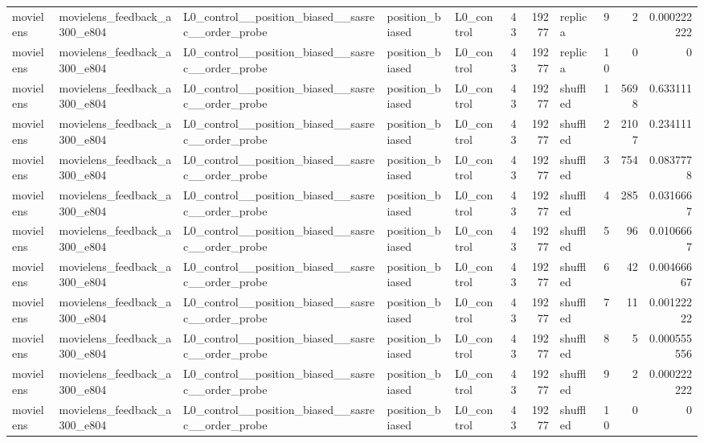 \begin{table}[htbp!]
\begin{tabular}{lllllrrlrrr}
movielens & movielens\_feedback\_a300\_e804 & L0\_control\_\_position\_biased\_\_sasrec\_\_order\_probe & position\_biased & L0\_control & 43 & 19277 & replica & 9 & 2 & 0.000222222 \\
movielens & movielens\_feedback\_a300\_e804 & L0\_control\_\_position\_biased\_\_sasrec\_\_order\_probe & position\_biased & L0\_control & 43 & 19277 & replica & 10 & 0 & 0 \\
movielens & movielens\_feedback\_a300\_e804 & L0\_control\_\_position\_biased\_\_sasrec\_\_order\_probe & position\_biased & L0\_control & 43 & 19277 & shuffled & 1 & 5698 & 0.633111 \\
movielens & movielens\_feedback\_a300\_e804 & L0\_control\_\_position\_biased\_\_sasrec\_\_order\_probe & position\_biased & L0\_control & 43 & 19277 & shuffled & 2 & 2107 & 0.234111 \\
movielens & movielens\_feedback\_a300\_e804 & L0\_control\_\_position\_biased\_\_sasrec\_\_order\_probe & position\_biased & L0\_control & 43 & 19277 & shuffled & 3 & 754 & 0.0837778 \\
movielens & movielens\_feedback\_a300\_e804 & L0\_control\_\_position\_biased\_\_sasrec\_\_order\_probe & position\_biased & L0\_control & 43 & 19277 & shuffled & 4 & 285 & 0.0316667 \\
movielens & movielens\_feedback\_a300\_e804 & L0\_control\_\_position\_biased\_\_sasrec\_\_order\_probe & position\_biased & L0\_control & 43 & 19277 & shuffled & 5 & 96 & 0.0106667 \\
movielens & movielens\_feedback\_a300\_e804 & L0\_control\_\_position\_biased\_\_sasrec\_\_order\_probe & position\_biased & L0\_control & 43 & 19277 & shuffled & 6 & 42 & 0.00466667 \\
movielens & movielens\_feedback\_a300\_e804 & L0\_control\_\_position\_biased\_\_sasrec\_\_order\_probe & position\_biased & L0\_control & 43 & 19277 & shuffled & 7 & 11 & 0.00122222 \\
movielens & movielens\_feedback\_a300\_e804 & L0\_control\_\_position\_biased\_\_sasrec\_\_order\_probe & position\_biased & L0\_control & 43 & 19277 & shuffled & 8 & 5 & 0.000555556 \\
movielens & movielens\_feedback\_a300\_e804 & L0\_control\_\_position\_biased\_\_sasrec\_\_order\_probe & position\_biased & L0\_control & 43 & 19277 & shuffled & 9 & 2 & 0.000222222 \\
movielens & movielens\_feedback\_a300\_e804 & L0\_control\_\_position\_biased\_\_sasrec\_\_order\_probe & position\_biased & L0\_control & 43 & 19277 & shuffled & 10 & 0 & 0 \\

\end{tabular}
\end{table}
